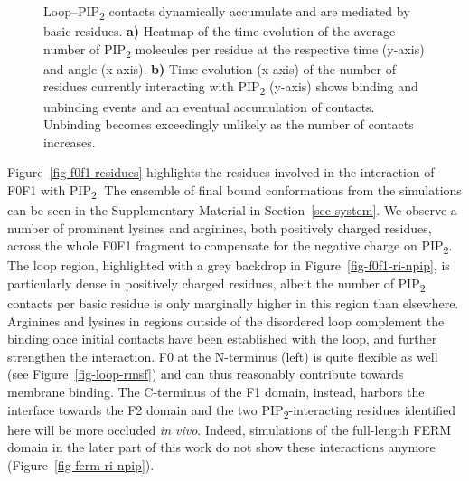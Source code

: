 \documentclass[
  twocolumn]{biophys-new-mod}
\begin{document}
\begin{figure}
\begin{minipage}[t]{\linewidth}
{{}

}

\subcaption{\label{fig-f0f1-retention}~}
\end{minipage}%

\caption{\label{fig-loop-importance-2}Loop--PIP\textsubscript{2}
contacts dynamically accumulate and are mediated by basic residues.
\textbf{a)} Heatmap of the time evolution of the average number of
PIP\textsubscript{2} molecules per residue at the respective time
(y-axis) and angle (x-axis). \textbf{b)} Time evolution (x-axis) of the
number of residues currently interacting with PIP\textsubscript{2}
(y-axis) shows binding and unbinding events and an eventual accumulation
of contacts. Unbinding becomes exceedingly unlikely as the number of
contacts increases.}

\end{figure}

Figure~\ref{fig-f0f1-residues} highlights the residues involved in the
interaction of F0F1 with PIP\textsubscript{2}. The ensemble of final
bound conformations from the simulations can be seen in the
Supplementary Material in Section~\ref{sec-system}. We observe a number
of prominent lysines and arginines, both positively charged residues,
across the whole F0F1 fragment to compensate for the negative charge on
PIP\textsubscript{2}. The loop region, highlighted with a grey backdrop
in Figure~\ref{fig-f0f1-ri-npip}, is particularly dense in positively
charged residues, albeit the number of PIP\textsubscript{2} contacts per
basic residue is only marginally higher in this region than elsewhere.
Arginines and lysines in regions outside of the disordered loop
complement the binding once initial contacts have been established with
the loop, and further strengthen the interaction. F0 at the N-terminus
(left) is quite flexible as well (see Figure~\ref{fig-loop-rmsf}) and
can thus reasonably contribute towards membrane binding. The C-terminus
of the F1 domain, instead, harbors the interface towards the F2 domain
and the two PIP\textsubscript{2}-interacting residues identified here
will be more occluded \emph{in vivo}. Indeed, simulations of the
full-length FERM domain in the later part of this work do not show these
interactions anymore (Figure~\ref{fig-ferm-ri-npip}).
\end{document}
